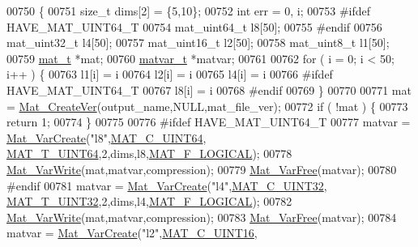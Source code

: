\begin{DoxyCode}
{{{00750 \{
00751     \textcolor{keywordtype}{size\_t} dims[2] = \{5,10\};
00752     \textcolor{keywordtype}{int}    err = 0, i;
00753 \textcolor{preprocessor}{#ifdef HAVE\_MAT\_UINT64\_T}
00754     mat\_uint64\_t   l8[50];
00755 \textcolor{preprocessor}{#endif}
00756     mat\_uint32\_t   l4[50];
00757     mat\_uint16\_t   l2[50];
00758     mat\_uint8\_t    l1[50];
00759     \hyperlink{struct__mat__t}{mat\_t} *mat;
00760     \hyperlink{group___m_a_t_structmatvar__t}{matvar\_t} *matvar;
00761 
00762     \textcolor{keywordflow}{for} ( i = 0; i < 50; i++ ) \{
00763         l1[i] = i %
00764         l2[i] = i %
00765         l4[i] = i %
00766 \textcolor{preprocessor}{#ifdef HAVE\_MAT\_UINT64\_T}
00767         l8[i] = i %
00768 \textcolor{preprocessor}{#endif}
00769     \}
00770 
00771     mat = \hyperlink{group___m_a_t_ga22d404f203af7869c841400e7ad247cf}{Mat\_CreateVer}(output\_name,NULL,mat\_file\_ver);
00772     \textcolor{keywordflow}{if} ( !mat ) \{
00773         \textcolor{keywordflow}{return} 1;
00774     \}
00775 
00776 \textcolor{preprocessor}{#ifdef HAVE\_MAT\_UINT64\_T}
00777     matvar = \hyperlink{group___m_a_t_ga1c54a84bb4d810c6fccdb8869489eac4}{Mat\_VarCreate}(\textcolor{stringliteral}{"l8"},\hyperlink{group___m_a_t_ggad4d60ae7b709fc81bfd744fb4c857c40a86470e25c3763d9a24623f04326195dd}{MAT\_C\_UINT64},
      \hyperlink{group___m_a_t_ggacf7b3b879282b7ab3a51190e49bf3453a45547932c46be27118abe08302d7e29f}{MAT\_T\_UINT64},2,dims,l8,\hyperlink{group___m_a_t_ggab9d6ef9e3ddca78a317b173f01d53fbba57eb5c6e200bcbc0f1b7982f29a169c2}{MAT\_F\_LOGICAL});
00778     \hyperlink{group___m_a_t_ga4bd3eba12df415d8226e27c457fbbb0b}{Mat\_VarWrite}(mat,matvar,compression);
00779     \hyperlink{group___m_a_t_ga1d14716f7450530fd1c9d02413787f0e}{Mat\_VarFree}(matvar);
00780 \textcolor{preprocessor}{#endif}
00781     matvar = \hyperlink{group___m_a_t_ga1c54a84bb4d810c6fccdb8869489eac4}{Mat\_VarCreate}(\textcolor{stringliteral}{"l4"},\hyperlink{group___m_a_t_ggad4d60ae7b709fc81bfd744fb4c857c40a9a17a7edd45b19ef68197db81b27e816}{MAT\_C\_UINT32},
      \hyperlink{group___m_a_t_ggacf7b3b879282b7ab3a51190e49bf3453aa397e285a23fe240368b752897652c6a}{MAT\_T\_UINT32},2,dims,l4,\hyperlink{group___m_a_t_ggab9d6ef9e3ddca78a317b173f01d53fbba57eb5c6e200bcbc0f1b7982f29a169c2}{MAT\_F\_LOGICAL});
00782     \hyperlink{group___m_a_t_ga4bd3eba12df415d8226e27c457fbbb0b}{Mat\_VarWrite}(mat,matvar,compression);
00783     \hyperlink{group___m_a_t_ga1d14716f7450530fd1c9d02413787f0e}{Mat\_VarFree}(matvar);
00784     matvar = \hyperlink{group___m_a_t_ga1c54a84bb4d810c6fccdb8869489eac4}{Mat\_VarCreate}(\textcolor{stringliteral}{"l2"},\hyperlink{group___m_a_t_ggad4d60ae7b709fc81bfd744fb4c857c40a8bede21dbf6c1edc0bbccc1481bccae7}{MAT\_C\_UINT16},
}}}
\end{DoxyCode}
